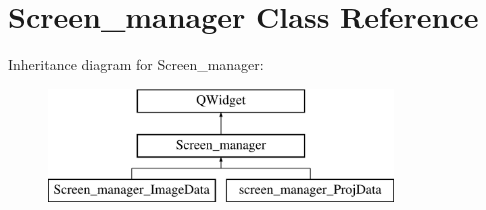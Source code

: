 \hypertarget{classScreen__manager}{}\section{Screen\+\_\+manager Class Reference}
\label{classScreen__manager}
Inheritance diagram for Screen\+\_\+manager\+:\begin{figure}[H]
\begin{center}
\leavevmode
\includegraphics[height=3.000000cm]{classScreen__manager}
\end{center}
\end{figure}

